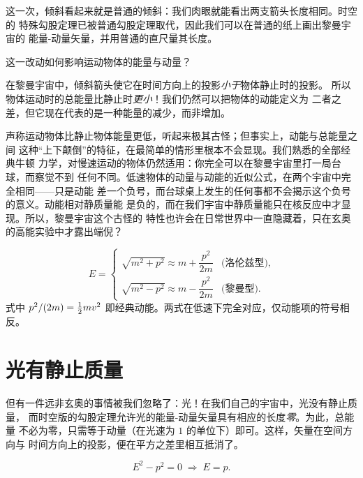 
这一次，倾斜看起来就是普通的倾斜：我们肉眼就能看出两支箭头长度相同。时空的
特殊勾股定理已被普通勾股定理取代，因此我们可以在普通的纸上画出黎曼宇宙的
能量-动量矢量，并用普通的直尺量其长度。

这一改动如何影响运动物体的能量与动量？


在黎曼宇宙中，倾斜箭头使它在时间方向上的投影\emph{小于}物体静止时的投影。
所以物体运动时的总能量比静止时\emph{更小}！我们仍然可以把物体的动能定义为
二者之差，但它现在代表的是一种能量的减少，而非增加。

声称运动物体比静止物体能量更低，听起来极其古怪；但事实上，动能与总能量之间
这种“上下颠倒”的特征，在最简单的情形里根本不会显现。我们熟悉的全部经典牛顿
力学，对慢速运动的物体仍然适用：你完全可以在黎曼宇宙里打一局台球，而察觉不到
任何不同。低速物体的动量与动能的近似公式，在两个宇宙中完全相同——只是动能
差一个负号，而台球桌上发生的任何事都不会揭示这个负号的意义。动能相对静质量能
是负的，而在我们宇宙中静质量能只在核反应中才显现。所以，黎曼宇宙这个古怪的
特性也许会在日常世界中一直隐藏着，只在玄奥的高能实验中才露出端倪？

\begin{equation}
E = \begin{cases}
\sqrt{m^2 + p^2} \approx m + \dfrac{p^2}{2m} & \text{(洛伦兹型)},\\[2ex]
\sqrt{m^2 - p^2} \approx m - \dfrac{p^2}{2m} & \text{(黎曼型)} .
\end{cases}
\end{equation}
式中 $p^2/(2m)=\tfrac{1}{2} mv^2$ 即经典动能。两式在低速下完全对应，仅动能项的符号相反。

\section{光有静止质量}

但有一件远非玄奥的事情被我们忽略了：光！在我们自己的宇宙中，光没有静止质量，
而时空版的勾股定理允许光的能量-动量矢量具有相应的长度\emph{零}。为此，总能量
不必为零，只需等于动量（在光速为 $1$ 的单位下）即可。这样，矢量在空间方向与
时间方向上的投影，便在平方之差里相互抵消了。


\begin{equation}
E^2 - p^2 = 0 \;\Longrightarrow\; E = p . \tag{2}
\end{equation}

